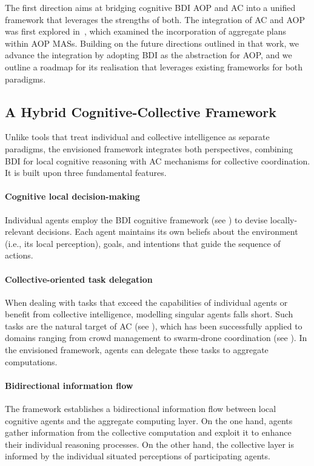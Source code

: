 The first direction aims at bridging cognitive \ac{BDI} \ac{AOP} and \ac{AC}
into a unified framework that leverages the strengths of both.
%
The integration of \ac{AC} and \ac{AOP} was first explored in~\cite{viroli2017ijaose},
which examined the incorporation of aggregate plans within \ac{AOP} \acp{MAS}.
%
Building on the future directions outlined in that work,
we advance the integration by adopting \ac{BDI} as the abstraction for \ac{AOP},
and we outline a roadmap for its realisation
that leverages existing frameworks for both paradigms.

\subsection{A Hybrid Cognitive-Collective Framework}

Unlike tools that treat individual and collective intelligence as separate paradigms,
the envisioned framework integrates both perspectives,
combining \ac{BDI} for local cognitive reasoning
with \ac{AC} mechanisms for collective coordination.
%
It is built upon three fundamental features.

\paragraph{Cognitive local decision-making}
Individual agents employ the \ac{BDI} cognitive framework (see ) to devise locally-relevant decisions.
%
Each agent maintains its own beliefs about the environment (i.e., its local perception),
goals, and intentions that guide the sequence of actions.

\paragraph{Collective-oriented task delegation}
When dealing with tasks that exceed the capabilities of individual agents
or benefit from collective intelligence,
modelling singular agents falls short.
%
Such tasks are the natural target of \ac{AC} (see ),
which has been successfully applied to domains ranging from crowd management
to swarm-drone coordination (see ).
%
In the envisioned framework,
agents can delegate these tasks to aggregate computations.

\paragraph{Bidirectional information flow}
The framework establishes a bidirectional information flow
between local cognitive agents and the aggregate computing layer.
%
On the one hand, agents gather information from the collective computation
and exploit it to enhance their individual reasoning processes.
%
On the other hand,
the collective layer is informed by the individual situated perceptions of participating agents.

